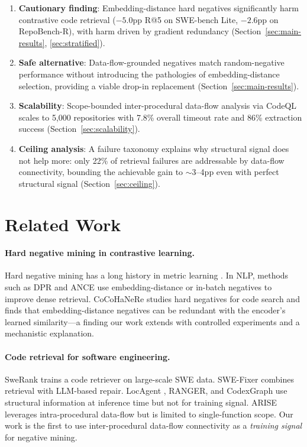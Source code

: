 \documentclass[11pt,a4paper]{article}
\begin{document}
\begin{enumerate}
\item \textbf{Cautionary finding}: Embedding-distance hard negatives significantly harm contrastive code retrieval ($-5.0$pp R@5 on SWE-bench Lite, $-2.6$pp on RepoBench-R), with harm driven by gradient redundancy (Section~\ref{sec:main-results}, \ref{sec:stratified}).

\item \textbf{Safe alternative}: Data-flow-grounded negatives match random-negative performance without introducing the pathologies of embedding-distance selection, providing a viable drop-in replacement (Section~\ref{sec:main-results}).

\item \textbf{Scalability}: Scope-bounded inter-procedural data-flow analysis via CodeQL scales to 5,000 repositories with 7.8\% overall timeout rate and 86\% extraction success (Section~\ref{sec:scalability}).

\item \textbf{Ceiling analysis}: A failure taxonomy explains why structural signal does not help more: only 22\% of retrieval failures are addressable by data-flow connectivity, bounding the achievable gain to $\sim$3--4pp even with perfect structural signal (Section~\ref{sec:ceiling}).
\end{enumerate}

\section{Related Work}

\paragraph{Hard negative mining in contrastive learning.}
Hard negative mining has a long history in metric learning \cite{schroff2015facenet}.
In NLP, methods such as DPR \cite{karpukhin2020dense} and ANCE \cite{xiong2021approximate} use embedding-distance or in-batch negatives to improve dense retrieval.
CoCoHaNeRe \cite{shi2023cochanere} studies hard negatives for code search and finds that embedding-distance negatives can be redundant with the encoder's learned similarity---a finding our work extends with controlled experiments and a mechanistic explanation.

\paragraph{Code retrieval for software engineering.}
SweRank \cite{zhang2025swerank} trains a code retriever on large-scale SWE data.
SWE-Fixer \cite{xie2025swefixer} combines retrieval with LLM-based repair.
LocAgent \cite{muhammad2024locagent}, RANGER, and CodexGraph use structural information at inference time but not for training signal.
ARISE \cite{wu2024arise} leverages intra-procedural data-flow but is limited to single-function scope.
Our work is the first to use inter-procedural data-flow connectivity as a \emph{training signal} for negative mining.
\end{document}
